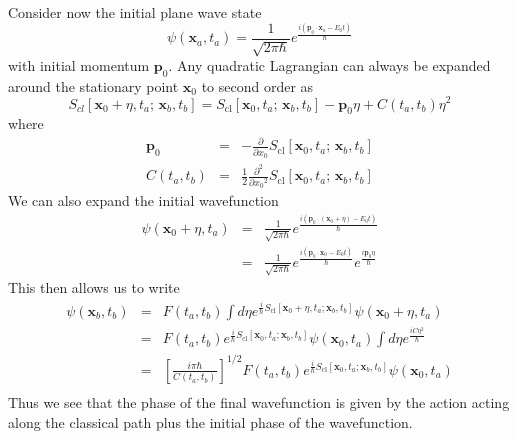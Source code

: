 \vspace{10mm}

Consider now the initial plane wave state
\begin{equation}
\psi\left(\mathbf{x}_a,t_a\right)=\frac{1}{\sqrt{2\pi\hbar}}e^{\frac{i\left(\mathbf{p}_0\cdot\mathbf{x}_a-E_0 t\right)}{\hbar}}
\end{equation}
with initial momentum $\mathbf{p}_0$. Any quadratic Lagrangian can always be expanded around the stationary point $\mathbf{x}_0$ to second order as
\begin{equation}
S_{cl}[\mathbf{x}_0+\eta,t_a;\,\mathbf{x}_b,t_b]=S_{\mathrm{cl}}[\mathbf{x}_0,t_a;\,\mathbf{x}_b,t_b]-\mathbf{p}_0\eta+C\left(t_a,t_b\right)\eta^2
\end{equation}
where 
\begin{eqnarray}
\mathbf{p}_0&=&-\frac{\partial}{\partial x_0}S_{\mathrm{cl}}[\mathbf{x}_0,t_a;\,\mathbf{x}_b,t_b]\\
C\left(t_a,t_b\right)&=&\frac{1}{2}\frac{\partial^2}{\partial {x_0}^2}S_{\mathrm{cl}}[\mathbf{x}_0,t_a;\,\mathbf{x}_b,t_b]
\end{eqnarray}
We can also expand the initial wavefunction 
\begin{eqnarray}
\psi\left(\mathbf{x}_0+\eta,t_a\right)&=&\frac{1}{\sqrt{2\pi\hbar}}e^{\frac{i\left(\mathbf{p}_0\cdot\left(\mathbf{x}_0+\eta\right)-E_0 t\right)}{\hbar}}\nonumber \\
&=&\frac{1}{\sqrt{2\pi\hbar}}e^{\frac{i\left(\mathbf{p}_0\cdot\mathbf{x}_0-E_0 t\right)}{\hbar}}e^{\frac{i\mathbf{p}_0\eta}{\hbar}}
\end{eqnarray}
This then allows us to write
\begin{eqnarray}
\psi\left(\mathbf{x}_b,t_b\right)&=&F\left(t_a,t_b\right)\int d\eta e^{\frac{i}{\hbar}S_{\mathrm{cl}}\left[\mathbf{x}_0+\eta,t_a;\mathbf{x}_b,t_b\right]}\psi\left(\mathbf{x}_0+\eta,t_a\right)\nonumber \\
&=& F\left(t_a,t_b\right) e^{\frac{i}{\hbar}S_{\mathrm{cl}}\left[\mathbf{x}_0,t_a;\mathbf{x}_b,t_b\right]}\psi\left(\mathbf{x}_0,t_a\right)\int d\eta e^{\frac{iC\eta^2}{\hbar}}\nonumber \\
&=&\left[\frac{i\pi\hbar}{C\left(t_a,t_b\right)}\right]^{1/2}F\left(t_a,t_b\right) e^{\frac{i}{\hbar}S_{\mathrm{cl}}\left[\mathbf{x}_0,t_a;\mathbf{x}_b,t_b\right]}\psi\left(\mathbf{x}_0,t_a\right) \nonumber \\
\end{eqnarray}
Thus we see that the phase of the final wavefunction is given by the action acting along the classical path plus the initial phase of the wavefunction. 

